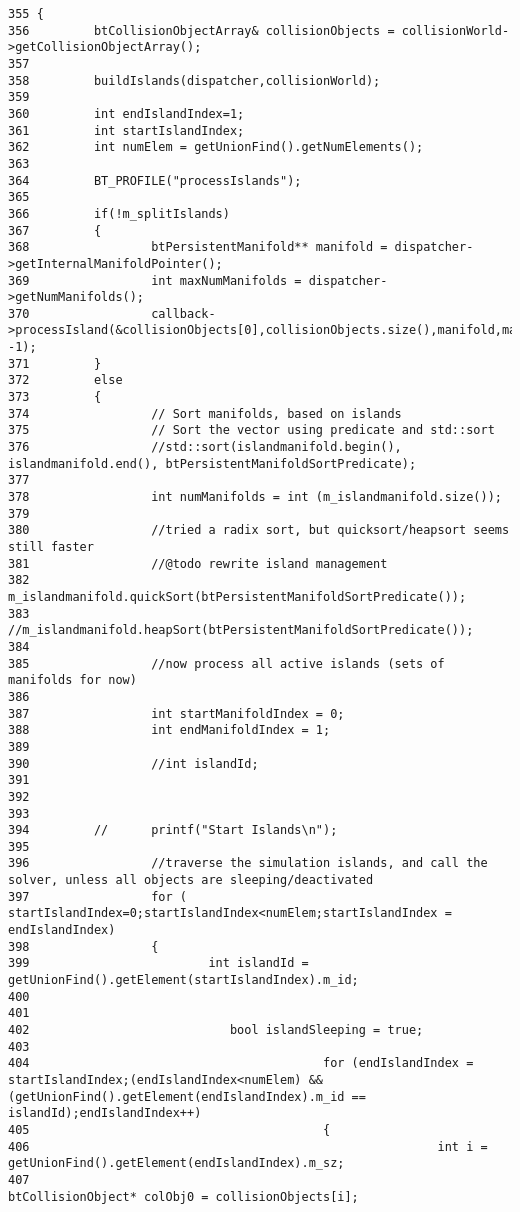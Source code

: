 \begin{Code}\begin{verbatim}355 {
356         btCollisionObjectArray& collisionObjects = collisionWorld->getCollisionObjectArray();
357 
358         buildIslands(dispatcher,collisionWorld);
359 
360         int endIslandIndex=1;
361         int startIslandIndex;
362         int numElem = getUnionFind().getNumElements();
363 
364         BT_PROFILE("processIslands");
365 
366         if(!m_splitIslands)
367         {
368                 btPersistentManifold** manifold = dispatcher->getInternalManifoldPointer();
369                 int maxNumManifolds = dispatcher->getNumManifolds();
370                 callback->processIsland(&collisionObjects[0],collisionObjects.size(),manifold,maxNumManifolds, -1);
371         }
372         else
373         {
374                 // Sort manifolds, based on islands
375                 // Sort the vector using predicate and std::sort
376                 //std::sort(islandmanifold.begin(), islandmanifold.end(), btPersistentManifoldSortPredicate);
377 
378                 int numManifolds = int (m_islandmanifold.size());
379 
380                 //tried a radix sort, but quicksort/heapsort seems still faster
381                 //@todo rewrite island management
382                 m_islandmanifold.quickSort(btPersistentManifoldSortPredicate());
383                 //m_islandmanifold.heapSort(btPersistentManifoldSortPredicate());
384 
385                 //now process all active islands (sets of manifolds for now)
386 
387                 int startManifoldIndex = 0;
388                 int endManifoldIndex = 1;
389 
390                 //int islandId;
391 
392                 
393 
394         //      printf("Start Islands\n");
395 
396                 //traverse the simulation islands, and call the solver, unless all objects are sleeping/deactivated
397                 for ( startIslandIndex=0;startIslandIndex<numElem;startIslandIndex = endIslandIndex)
398                 {
399                         int islandId = getUnionFind().getElement(startIslandIndex).m_id;
400 
401 
402                            bool islandSleeping = true;
403                         
404                                         for (endIslandIndex = startIslandIndex;(endIslandIndex<numElem) && (getUnionFind().getElement(endIslandIndex).m_id == islandId);endIslandIndex++)
405                                         {
406                                                         int i = getUnionFind().getElement(endIslandIndex).m_sz;
407                                                         btCollisionObject* colObj0 = collisionObjects[i];

\end{verbatim}
\end{Code}
